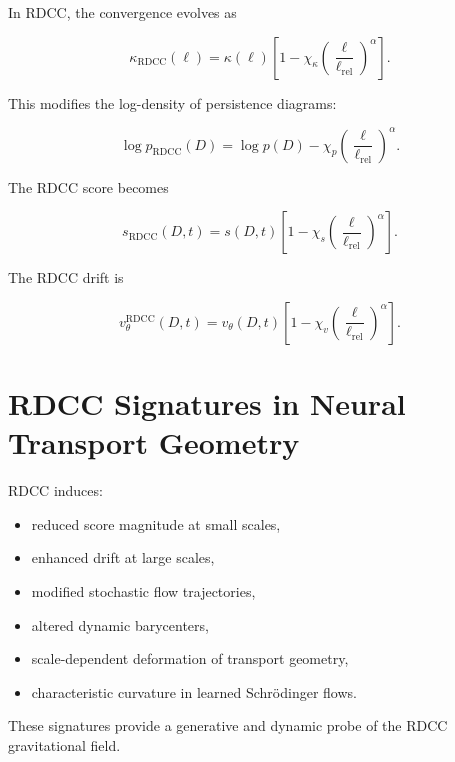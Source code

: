 \documentclass[11pt,a4paper]{article}
\begin{document}
In RDCC, the convergence evolves as

\begin{equation}
    \kappa_{\mathrm{RDCC}}(\ell)
    = \kappa(\ell)
      \left[
        1 - \chi_{\kappa}
        \left(\frac{\ell}{\ell_{\mathrm{rel}}}\right)^{\alpha}
      \right].
\end{equation}

This modifies the log-density of persistence diagrams:

\begin{equation}
    \log p_{\mathrm{RDCC}}(D)
    = \log p(D)
      - \chi_{p}
        \left(\frac{\ell}{\ell_{\mathrm{rel}}}\right)^{\alpha}.
\end{equation}

The RDCC score becomes

\begin{equation}
    s_{\mathrm{RDCC}}(D, t)
    = s(D, t)
      \left[
        1 - \chi_{s}
        \left(\frac{\ell}{\ell_{\mathrm{rel}}}\right)^{\alpha}
      \right].
\end{equation}

The RDCC drift is

\begin{equation}
    v^{\mathrm{RDCC}}_{\theta}(D, t)
    = v_{\theta}(D, t)
      \left[
        1 - \chi_{v}
        \left(\frac{\ell}{\ell_{\mathrm{rel}}}\right)^{\alpha}
      \right].
\end{equation}
\section{RDCC Signatures in Neural Transport Geometry}

RDCC induces:

\begin{itemize}
    \item reduced score magnitude at small scales,
    \item enhanced drift at large scales,
    \item modified stochastic flow trajectories,
    \item altered dynamic barycenters,
    \item scale-dependent deformation of transport geometry,
    \item characteristic curvature in learned Schrödinger flows.
\end{itemize}

These signatures provide a generative and dynamic probe of the RDCC gravitational 
field.
\end{document}
